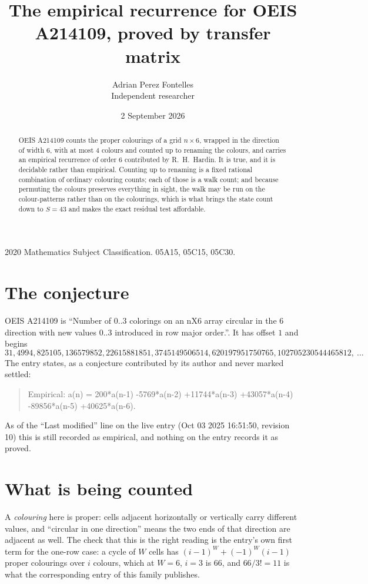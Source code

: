 \documentclass[11pt,a4paper]{article}
\title{The empirical recurrence for OEIS A214109, proved by transfer matrix}
\author{Adrian Perez Fontelles\\ \small Independent researcher}
\date{2 September 2026}
\theoremstyle{plain}
\theoremstyle{definition}
\begin{document}
\maketitle

\begin{abstract}
OEIS A214109 counts the proper colourings of a grid $n\times6$, wrapped in the direction of width $6$, with at most $4$ colours and
counted up to renaming the colours, and carries an empirical recurrence of order $6$
contributed by R.~H.~Hardin. It is true, and it is decidable rather than empirical. Counting
up to renaming is a fixed rational combination of ordinary colouring counts; each of those is
a walk count; and because permuting the colours preserves everything in sight, the walk may be
run on the colour-patterns rather than on the colourings, which is what brings the state count
down to $S=43$ and makes the exact residual test affordable.
\end{abstract}

\noindent\small 2020 Mathematics Subject Classification. 05A15, 05C15, 05C30.\normalsize

\section{The conjecture}

OEIS A214109 is ``Number of 0..3 colorings on an nX6 array circular in the 6 direction with new values 0..3 introduced in row major order.''. It has offset $1$ and begins
\[
31, 4994, 825105, 136579852, 22615881851, 3745149506514, 620197951750765, 102705230544465812,\ \dots
\]
The entry states, as a conjecture contributed by its author and never marked settled:
\begin{quote}
Empirical: a(n) = 200*a(n-1) -5769*a(n-2) +11744*a(n-3) +43057*a(n-4) -89856*a(n-5) +40625*a(n-6).
\end{quote}
As of the ``Last modified'' line on the live entry (Oct 03 2025 16:51:50, revision 10) this is still
recorded as empirical, and nothing on the entry records it as proved.

\section{What is being counted}

A \emph{colouring} here is proper: cells adjacent horizontally or vertically carry different
values, and ``circular in one direction'' means the two ends of that direction are adjacent as
well. The check that this is the right reading is the entry's own first term for the
one-row case: a cycle of $W$ cells has $(i-1)^W+(-1)^W(i-1)$ proper colourings over $i$
colours, which at $W=6$, $i=3$ is $66$, and $66/3!=11$ is what the corresponding entry of this
family publishes.
\end{document}
